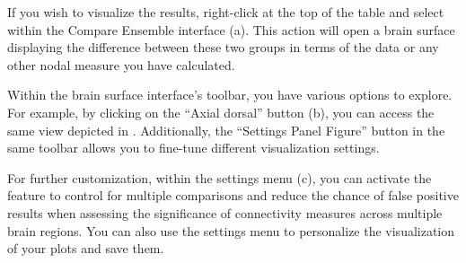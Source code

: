 \documentclass[justified]{tufte-handout}
\begin{document}

If you wish to visualize the results, right-click at the top of the table and select  within the Compare Ensemble interface (a). This action will open a brain surface displaying the difference between these two groups in terms of the  data or any other nodal measure you have calculated.

Within the brain surface interface's toolbar, you have various options to explore. For example, by clicking on the “Axial dorsal” button (b), you can access the same view depicted in . Additionally, the “Settings Panel Figure” button in the same toolbar allows you to fine-tune different visualization settings.

For further customization, within the settings menu (c), you can activate the  feature to control for multiple comparisons and reduce the chance of false positive results when assessing the significance of connectivity measures across multiple brain regions. You can also use the settings menu to personalize the visualization of your plots and save them.
\end{document}
